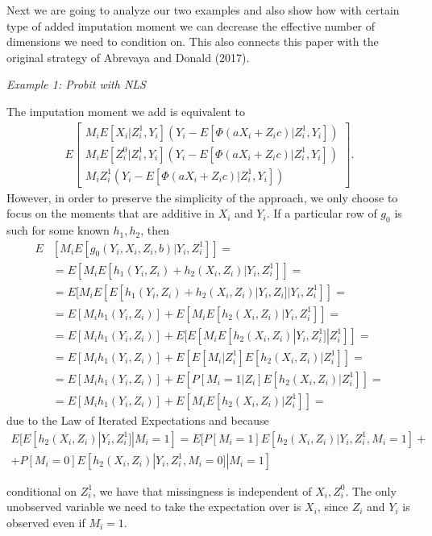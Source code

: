 \documentclass{article}
\theoremstyle{definition}
\theoremstyle{remark}
\begin{document}
Next we are going to analyze our two examples and also show how with certain type of added imputation moment we can decrease the effective number of dimensions we need to condition on. This also connects this paper with the original strategy of Abrevaya and Donald (2017).

\emph{Example 1: Probit with NLS}

The imputation moment we add is equivalent to
\begin{align}
E\left[\begin{array}{c}
M_i E[X_i|Z^1_i, Y_i](Y_i-E[\Phi(aX_i+Z_ic)|Z_i^1,Y_i])\\
M_i E[Z_i^0|Z^1_i, Y_i](Y_i-E[\Phi(aX_i+Z_ic)|Z_i^1,Y_i]) \\
M_i Z^1_i(Y_i-E[\Phi(aX_i+Z_ic)|Z_i^1,Y_i])
\end{array}
\right].
\end{align}
However, in order to preserve the simplicity of the approach, we only choose to focus on the moments that are additive in $X_i$ and $Y_i$. If a particular row of $g_0$ is such for some known $h_1,h_2$, then
\begin{align}
E&[M_i E[g_0(Y_i,X_i,Z_i,b)|Y_i,Z_i^1]]= \\
&= E[M_iE[h_1(Y_i,Z_i)+h_2(X_i,Z_i)|Y_i,Z_i^1]]= \nonumber \\
&= E[M_iE[E[h_1(Y_i,Z_i)+h_2(X_i,Z_i)|Y_i,Z_i]|Y_i,Z_i^1]]= \nonumber \\
&= E[M_i h_1(Y_i,Z_i)] +E[M_i E[h_2(X_i,Z_i)|Y_i, Z_i^1]]= \nonumber \\
&=E[M_i h_1(Y_i,Z_i)] +E[E[M_i E[h_2(X_i,Z_i)|Y_i, Z_i^1]|Z_i^1]]= \nonumber \\
&=E[M_i h_1(Y_i,Z_i)] +E[E[M_i|Z_i^1] E[h_2(X_i,Z_i)|Z_i^1]]= \nonumber \\
&=E[M_i h_1(Y_i,Z_i)] +E[P[M_i=1|Z_i]E[h_2(X_i,Z_i)|Z_i^1]]= \nonumber \\
&= E[M_i h_1(Y_i,Z_i)] +E[M_i E[h_2(X_i,Z_i)|Z^1_i]]= 
\end{align}
due to the Law of Iterated Expectations and because
\begin{align}
E[E[ h_2(X_i,Z_i)|Y_i, Z_i^1]|M_i=1] = E[P[M_i=1]E[h_2(X_i,Z_i)|Y_i, Z_i^1, M_i=1] + \\
+P[M_i=0]E[h_2(X_i,Z_i)|Y_i, Z_i^1, M_i=0]|M_i=1] 
\end{align}

 conditional on $Z_i^1$, we have that missingness is independent of $X_i,Z_i^0$. The only unobserved variable we need to take the expectation over is $X_i$, since $Z_i$ and $Y_i$ is observed even if $M_i=1$.
\end{document}
